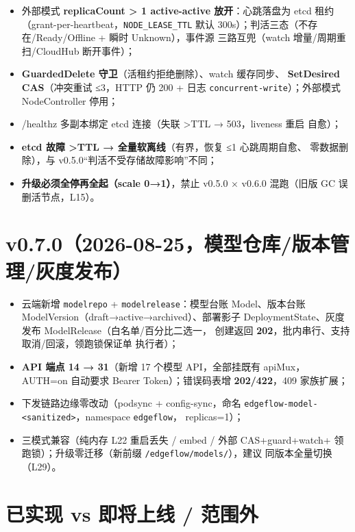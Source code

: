 \begin{itemize}
  \item 外部模式 \textbf{replicaCount > 1 active-active 放开}：心跳落盘为
        etcd 租约（grant-per-heartbeat，\texttt{NODE\_LEASE\_TTL} 默认
        300s）；判活三态（不存在/Ready/Offline + 瞬时 Unknown），事件源
        三路互兜（watch 增量/周期重扫/CloudHub 断开事件）；
  \item \textbf{GuardedDelete 守卫}（活租约拒绝删除）、watch 缓存同步、
        \textbf{SetDesired CAS}（冲突重试 ≤3，HTTP 仍 200 + 日志
        \texttt{concurrent-write}）；外部模式 NodeController 停用；
  \item /healthz 多副本绑定 etcd 连接（失联 >TTL → 503，liveness 重启
        自愈）；
  \item \textbf{etcd 故障 >TTL → 全量软离线}（有界，恢复 ≤1 心跳周期自愈、
        零数据删除），与 v0.5.0“判活不受存储故障影响”不同；
  \item \textbf{升级必须全停再全起（scale 0→1）}，禁止 v0.5.0 × v0.6.0
        混跑（旧版 GC 误删活节点，L15）。
\end{itemize}

\section{v0.7.0（2026-08-25，模型仓库/版本管理/灰度发布）}

\begin{itemize}
  \item 云端新增 \texttt{modelrepo} + \texttt{modelrelease}：模型台账
        Model、版本台账 ModelVersion（draft→active→archived）、部署影子
        DeploymentState、灰度发布 ModelRelease（白名单/百分比二选一，
        创建返回 \textbf{202}，批内串行、支持取消/回滚，领跑锁保证单
        执行者）；
  \item \textbf{API 端点 14 → 31}（新增 17 个模型 API，全部挂既有 apiMux，
        AUTH=on 自动要求 Bearer Token）；错误码表增 \textbf{202/422}，409
        家族扩展；
  \item 下发链路边缘零改动（podsync + config-sync，命名
        \texttt{edgeflow-model-<sanitized>}，namespace \texttt{edgeflow}，
        replicas=1）；
  \item 三模式兼容（纯内存 L22 重启丢失 / embed / 外部 CAS+guard+watch+
        领跑锁）；升级零迁移（新前缀 \texttt{/edgeflow/models/}），建议
        同版本全量切换（L29）。
\end{itemize}

\section{已实现 vs 即将上线 / 范围外}

